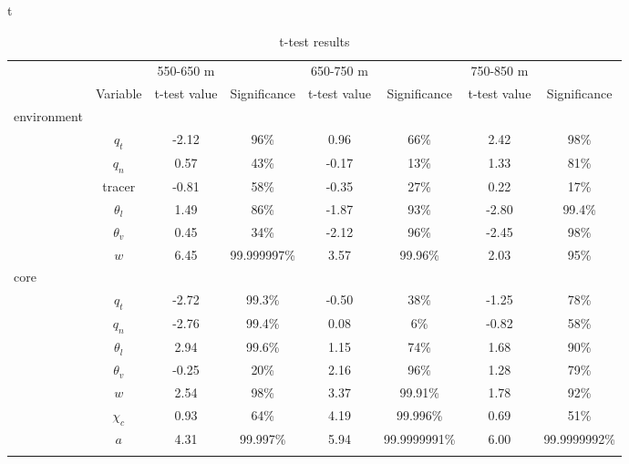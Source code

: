 \documentclass[acp]{copernicus}
\begin{document}

t
\begin{table}[t]
\caption{t-test results}
\vskip4mm
\centering
\begin{tabular}{lccccccc}
\tophline
&&550-650 m&&650-750 m&&750-850 m& \\
&Variable&t-test value&Significance&t-test value&Significance&t-test value&Significance\\

\middlehline

environment &&       &      &       &      &       & \\
& $q_t$      & -2.12 & 96\% &  0.96 & 66\% &  2.42 & 98\% \\
& $q_n$      &  0.57 & 43\% & -0.17 & 13\% &  1.33 & 81\% \\
& tracer     & -0.81 & 58\% & -0.35 & 27\% &  0.22 & 17\% \\ 
& $\theta_l$ &  1.49 & 86\% & -1.87 & 93\% & -2.80 & 99.4\% \\
& $\theta_v$ &  0.45 & 34\% & -2.12 & 96\% & -2.45 & 98\% \\
& $w$        &  6.45 & 99.999997\% &  3.57 & 99.96\% &  2.03 & 95\% \\
core        &&       &          &       &      &       & \\
& $q_t$      & -2.72 & 99.3\%   & -0.50 & 38\% & -1.25 & 78\% \\
& $q_n$      & -2.76 & 99.4\%   &  0.08 & 6\%  & -0.82 & 58\% \\
& $\theta_l$ &  2.94 & 99.6\%   &  1.15 & 74\% &  1.68 & 90\% \\
& $\theta_v$ & -0.25 & 20\%     &  2.16 & 96\% &  1.28 & 79\% \\
& $w$        &  2.54 & 98\%     &  3.37 & 99.91\% &  1.78 & 92\% \\
& $\chi_c$   &  0.93 & 64\%     &  4.19 & 99.996\% &  0.69 & 51\% \\
& $a$        &  4.31 & 99.997\% &  5.94 & 99.9999991\% &  6.00 & 99.9999992\% \\

\bottomhline
\end{tabular}
\end{table}






\end{document}
